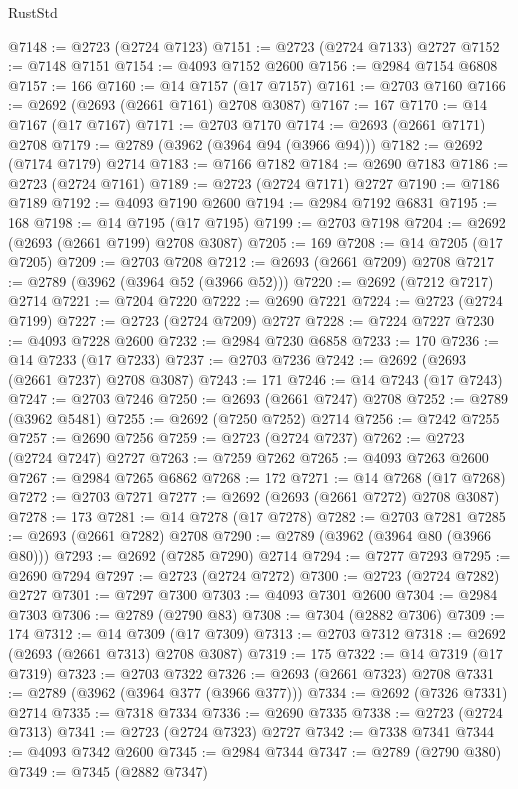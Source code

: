 \begin{lexlean}{RustStd}
\begin{coremodule}
@7148 := @2723 (@2724 @7123)
@7151 := @2723 (@2724 @7133) @2727
@7152 := @7148 @7151
@7154 := @4093 @7152 @2600
@7156 := @2984 @7154 @6808
@7157 := 166
@7160 := @14 @7157 (@17 @7157)
@7161 := @2703 @7160
@7166 := @2692 (@2693 (@2661 @7161) @2708 @3087)
@7167 := 167
@7170 := @14 @7167 (@17 @7167)
@7171 := @2703 @7170
@7174 := @2693 (@2661 @7171) @2708
@7179 := @2789 (@3962 (@3964 @94 (@3966 @94)))
@7182 := @2692 (@7174 @7179) @2714
@7183 := @7166 @7182
@7184 := @2690 @7183
@7186 := @2723 (@2724 @7161)
@7189 := @2723 (@2724 @7171) @2727
@7190 := @7186 @7189
@7192 := @4093 @7190 @2600
@7194 := @2984 @7192 @6831
@7195 := 168
@7198 := @14 @7195 (@17 @7195)
@7199 := @2703 @7198
@7204 := @2692 (@2693 (@2661 @7199) @2708 @3087)
@7205 := 169
@7208 := @14 @7205 (@17 @7205)
@7209 := @2703 @7208
@7212 := @2693 (@2661 @7209) @2708
@7217 := @2789 (@3962 (@3964 @52 (@3966 @52)))
@7220 := @2692 (@7212 @7217) @2714
@7221 := @7204 @7220
@7222 := @2690 @7221
@7224 := @2723 (@2724 @7199)
@7227 := @2723 (@2724 @7209) @2727
@7228 := @7224 @7227
@7230 := @4093 @7228 @2600
@7232 := @2984 @7230 @6858
@7233 := 170
@7236 := @14 @7233 (@17 @7233)
@7237 := @2703 @7236
@7242 := @2692 (@2693 (@2661 @7237) @2708 @3087)
@7243 := 171
@7246 := @14 @7243 (@17 @7243)
@7247 := @2703 @7246
@7250 := @2693 (@2661 @7247) @2708
@7252 := @2789 (@3962 @5481)
@7255 := @2692 (@7250 @7252) @2714
@7256 := @7242 @7255
@7257 := @2690 @7256
@7259 := @2723 (@2724 @7237)
@7262 := @2723 (@2724 @7247) @2727
@7263 := @7259 @7262
@7265 := @4093 @7263 @2600
@7267 := @2984 @7265 @6862
@7268 := 172
@7271 := @14 @7268 (@17 @7268)
@7272 := @2703 @7271
@7277 := @2692 (@2693 (@2661 @7272) @2708 @3087)
@7278 := 173
@7281 := @14 @7278 (@17 @7278)
@7282 := @2703 @7281
@7285 := @2693 (@2661 @7282) @2708
@7290 := @2789 (@3962 (@3964 @80 (@3966 @80)))
@7293 := @2692 (@7285 @7290) @2714
@7294 := @7277 @7293
@7295 := @2690 @7294
@7297 := @2723 (@2724 @7272)
@7300 := @2723 (@2724 @7282) @2727
@7301 := @7297 @7300
@7303 := @4093 @7301 @2600
@7304 := @2984 @7303
@7306 := @2789 (@2790 @83)
@7308 := @7304 (@2882 @7306)
@7309 := 174
@7312 := @14 @7309 (@17 @7309)
@7313 := @2703 @7312
@7318 := @2692 (@2693 (@2661 @7313) @2708 @3087)
@7319 := 175
@7322 := @14 @7319 (@17 @7319)
@7323 := @2703 @7322
@7326 := @2693 (@2661 @7323) @2708
@7331 := @2789 (@3962 (@3964 @377 (@3966 @377)))
@7334 := @2692 (@7326 @7331) @2714
@7335 := @7318 @7334
@7336 := @2690 @7335
@7338 := @2723 (@2724 @7313)
@7341 := @2723 (@2724 @7323) @2727
@7342 := @7338 @7341
@7344 := @4093 @7342 @2600
@7345 := @2984 @7344
@7347 := @2789 (@2790 @380)
@7349 := @7345 (@2882 @7347)

\end{coremodule}
\end{lexlean}
